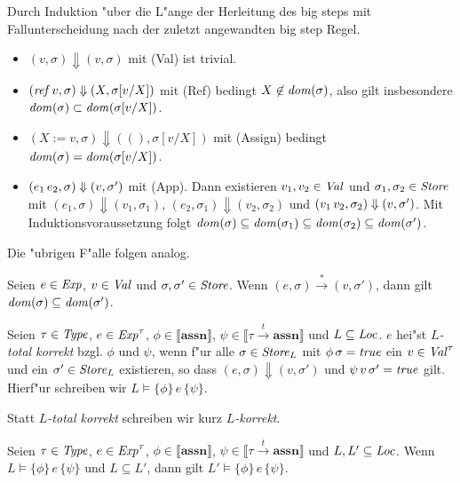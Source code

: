 \documentclass[12pt,a4paper,bigheadings]{scrartcl}
\newcommand{\semantic}[1]{\ensuremath{\llbracket#1\rrbracket}}
\newcommand{\assn}{\ensuremath{\mathbf{assn}}}
\newcommand{\tto}{\ensuremath{\xrightarrow{t}}}
\newcommand{\RN}[1]{\mbox{{\sc (#1)}}}
\newcommand{\TC}[4]{#1 \models \{#2\}\,#3\,\{#4\}}
\begin{document}
\begin{beweis}
  Durch Induktion "uber die L"ange der Herleitung des big steps mit Fallunterscheidung nach
  der zuletzt angewandten big step Regel.
  \begin{itemize}
    \item $(v,\sigma) \Downarrow (v,\sigma)$ mit \RN{Val} ist trivial.
    \item $({\text{\it ref\/}}\,v,\sigma) \Downarrow (X,\sigma[v/X])$ mit \RN{Ref} bedingt $X \not \in {\text{\it dom\/}}(\sigma)$, also gilt
          insbesondere ${\text{\it dom\/}}(\sigma) \subset {\text{\it dom\/}}(\sigma[v/X])$.
    \item $(X := v,\sigma) \Downarrow ((),\sigma[v/X])$ mit \RN{Assign} bedingt ${\text{\it dom\/}}(\sigma) = {\text{\it dom\/}}(\sigma[v/X])$.
    \item $(e_1\,e_2,\sigma) \Downarrow (v,\sigma')$ mit \RN{App}. Dann existieren $v_1,v_2\in{\text{\it Val\/}}$ und
          $\sigma_1,\sigma_2\in{\text{\it Store\/}}$ mit $(e_1,\sigma) \Downarrow (v_1,\sigma_1)$,
          $(e_2,\sigma_1) \Downarrow (v_2,\sigma_2)$ und $(v_1\,v_2,\sigma_2) \Downarrow (v,\sigma')$.
          Mit Induktionsvoraussetzung folgt
          ${\text{\it dom\/}}(\sigma)\subseteq{\text{\it dom\/}}(\sigma_1) \subseteq{\text{\it dom\/}}(\sigma_2) \subseteq {\text{\it dom\/}}(\sigma')$.
  \end{itemize}
  Die "ubrigen F"alle folgen analog.
\end{beweis}

\begin{korollar}
  Seien $e\in{\text{\it Exp\/}}$, $v\in{\text{\it Val\/}}$ und $\sigma,\sigma'\in{\text{\it Store\/}}$. Wenn
  $(e,\sigma) \xrightarrow* (v,\sigma')$, dann gilt ${\text{\it dom\/}}(\sigma) \subseteq {\text{\it dom\/}}(\sigma')$.
\end{korollar}

\begin{definition}
  Seien $\tau\in{\text{\it Type\/}}$, $e\in{\text{\it Exp\/}}^\tau$,
  $\phi \in \semantic{\assn}$, $\psi \in \semantic{\tau \tto \assn}$
  und $L \subseteq {\text{\it Loc\/}}$.
  $e$ hei"st {\em $L$-total korrekt} bzgl. $\phi$ und $\psi$, wenn f"ur alle
  $\sigma\in{\text{\it Store\/}}_L$ mit $\phi\,\sigma={\text{\it true\/}}$ ein $v\in{\text{\it Val\/}}^\tau$ und ein
  $\sigma'\in{\text{\it Store\/}}_L$ existieren, so dass $(e,\sigma) \Downarrow (v,\sigma')$ und
  $\psi\,v\,\sigma'={\text{\it true\/}}$ gilt. Hierf"ur schreiben wir $\TC{L}{\phi}{e}{\psi}$.
\end{definition}

Statt {\em $L$-total korrekt} schreiben wir kurz {\em $L$-korrekt}.

\begin{lemma}
  Seien $\tau\in{\text{\it Type\/}}$, $e \in {\text{\it Exp\/}}^\tau$,
  $\phi \in \semantic{\assn}$, $\psi \in \semantic{\tau \tto \assn}$
  und $L,L' \subseteq {\text{\it Loc\/}}$. Wenn $\TC{L}{\phi}{e}{\psi}$ und
  $L \subseteq L'$, dann gilt $\TC{L'}{\phi}{e}{\psi}$.
\end{lemma}
\end{document}

